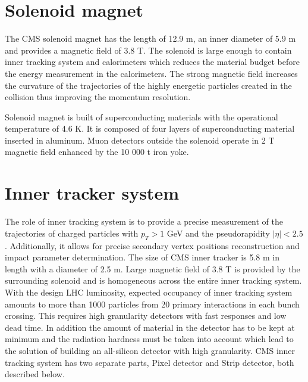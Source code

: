 \section{Solenoid magnet}

The CMS solenoid magnet has the length of 12.9 m, an inner diameter of 5.9 m and provides a magnetic field of 3.8 T. The solenoid is large enough to contain inner tracking system and calorimeters  which reduces the material budget before the energy measurement in the calorimeters. The strong magnetic field increases the curvature of the trajectories of the highly energetic particles created in the collision thus improving the momentum resolution.
\par Solenoid magnet is built of superconducting materials with the operational temperature of 4.6 K. It is composed of four layers of superconducting material inserted in aluminum. Muon detectors outside the solenoid operate in 2 T magnetic field enhanced by the 10 000 t iron yoke.  


\section{Inner tracker system}

The role of inner tracking system is to provide a precise measurement of the trajectories of charged particles with $p_T>1$ GeV and the pseudorapidity $|\eta|<2.5$. Additionally, it allows for precise secondary vertex positions reconstruction and impact parameter determination. The size of CMS inner tracker is 5.8 m in length with a diameter of 2.5 m. Large magnetic field of 3.8 T is provided by the surrounding solenoid and is homogeneous across the entire inner tracking system. With the design LHC luminosity, expected occupancy of inner tracking system amounts to more than 1000 particles from 20 primary interactions in each bunch crossing. This requires high granularity detectors with fast responses and low dead time. In addition the amount of material in the detector has to be kept at minimum and the radiation hardness must be taken into account which lead to the solution of building an all-silicon detector with high granularity. CMS inner tracking system has two separate parts, Pixel detector and Strip detector, both described below.    



